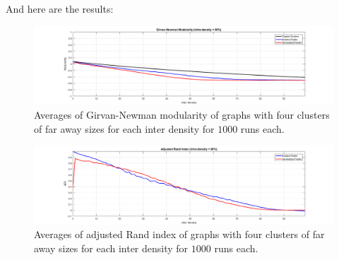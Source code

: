 \documentclass{amsart}
\begin{document}
			And here are the results:
			
			\begin{figure}[h]
			\begin{center}
				\includegraphics[width = \linewidth, trim = 70 0 70 10, clip]{four_faraway_clusters_modularity}
				\caption{Averages of Girvan-Newman modularity of graphs with four clusters of far away sizes for each inter density for $1000$ runs each.}
				\label{four_faraway_clusters_GNM}
			\end{center}
			\end{figure}
		
			\begin{figure}[h]
			\begin{center}
				\includegraphics[width = \linewidth, trim = 70 0 70 10, clip]{four_faraway_clusters_ari}
				\caption{Averages of adjusted Rand index of graphs with four clusters of far away sizes for each inter density for $1000$ runs each.}
				\label{four_faraway_clusters_ARI}
			\end{center}
			\end{figure}
\end{document}
